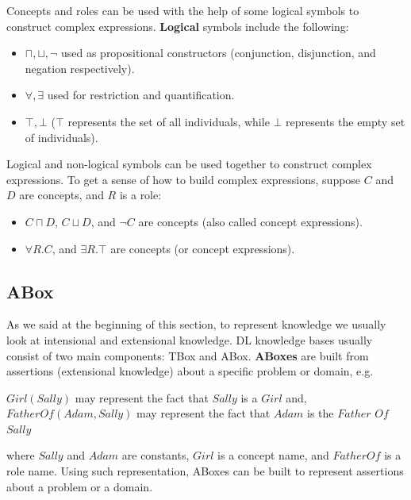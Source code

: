 Concepts and roles can be used with the help of some logical symbols to construct complex expressions. \textbf{Logical} symbols include the following:
\begin{itemize}
\item $\sqcap, \sqcup, \neg$ used as propositional constructors (conjunction, disjunction, and negation respectively).
\item $\forall, \exists$ used for restriction and quantification.
\item $\top, \bot$ ($\top$ represents the set of all individuals, while $\bot$ represents the empty set of individuals). 
\end{itemize}

Logical and non-logical symbols can be used together to construct complex expressions. To get a sense of how to build complex expressions, suppose $C$ and $D$ are concepts, and $R$ is a role:
\begin{itemize}
\item $C \sqcap D$, $C \sqcup D$, and $\neg C$ are concepts (also called concept expressions).
\item $\forall R.C$, and $\exists R.\top$ are concepts (or concept expressions).
\end{itemize}


\subsection{ABox}
As we said at the beginning of this section, to represent knowledge we usually look at intensional and extensional knowledge. DL knowledge bases usually consist of two main components: TBox and ABox. \textbf{ABoxes} are built from assertions (extensional knowledge) about a specific problem or domain, e.g.
\begin{center}
$Girl(Sally)$ may represent the fact that $Sally$ is a $Girl$ and, \\
$FatherOf(Adam, Sally)$ may represent the fact that $Adam$ is the $Father$ $Of$ $Sally$
\end{center} 
where $Sally$ and $Adam$ are constants, $Girl$ is a concept name, and $FatherOf$ is a role name. Using such representation, ABoxes can be built to represent assertions about a problem or a domain.



